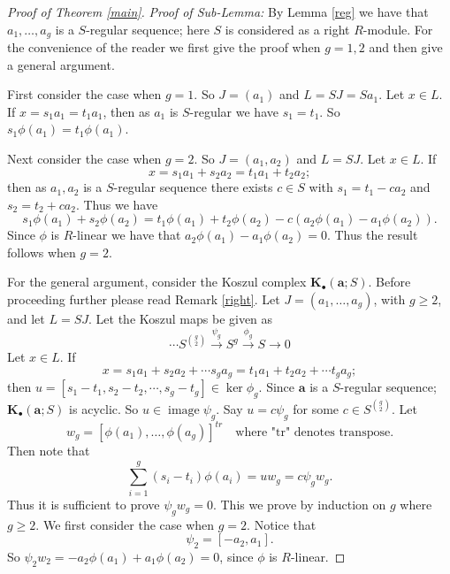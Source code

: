 \documentclass{amsart}
\theoremstyle{plain}
\theoremstyle{definition}
\theoremstyle{remark}
\numberwithin{equation}{theorem}
\begin{document}
\begin{proof}[Proof of Theorem \ref{main}]
\textit{Proof of Sub-Lemma:} By Lemma \ref{reg} we have that $a_1,\ldots,a_g$ is a $S$-regular sequence; here $S$ is considered as a right $R$-module.  For the convenience of the reader we first give the proof when $g = 1, 2$ and then give a
general argument.

First consider the case when $g = 1$. So $J = (a_1)$ and $L = SJ = Sa_1$. Let $x \in L$. If $x = s_1a_1 = t_1a_1$, then as $a_1$ is $S$-regular we have $s_1 = t_1$. So $s_1\phi(a_1) = t_1 \phi(a_1)$.

Next consider the case when $g = 2$. So $J = (a_1,a_2)$ and $L = SJ$.  Let $x \in L$. If
$$x = s_1a_1 + s_2 a_2 = t_1a_1 + t_2a_2; $$
then as $a_1, a_2$ is a $S$-regular sequence there exists $c \in S$ with  $s_1 = t_1 - ca_2$ and $s_2 = t_2 + ca_2$. Thus we have
\[
s_1\phi(a_1) + s_2 \phi(a_2) = t_1\phi(a_1) + t_2 \phi(a_2) - c\left(a_2\phi(a_1) - a_1\phi(a_2) \right).
\]
Since $\phi$ is $R$-linear we have that $a_2\phi(a_1) - a_1\phi(a_2) = 0$. Thus the result follows when $g = 2$.

For the general argument, consider the Koszul complex ${\mathbf{K}_{\bullet} }({\mathbf{a}};S)$. Before proceeding further please read Remark \ref{right}. Let $J = (a_1,\ldots,a_g)$, with $g \geq 2$, and let $L = SJ$.
Let the Koszul maps be given as
\[
\cdots S^{\binom{g}{2}} \xrightarrow{\psi_g} S^g \xrightarrow{\phi_g} S {\rightarrow} 0
\]
Let $x \in L$. If
\[
x = s_1a_1 + s_2 a_2 + \cdots s_g a_g = t_1a_1 + t_2a_2 + \cdots t_g a_g;
\]
then $u = [s_1 -t_1, s_2 -t_2,\cdots,s_g -t_g] \in \ker \phi_g$. Since ${\mathbf{a}}$ is a $S$-regular sequence;  ${\mathbf{K}_{\bullet} }({\mathbf{a}};S)$ is acyclic. So $u \in {\operatorname{image}} \psi_g$. Say $u = c\psi_g$ for some $c \in S^{\binom{g}{2}}$. Let
\[
w_g = [\phi(a_1),\ldots,\phi(a_g)]^{tr} \quad \text{where "tr" denotes transpose}.
\]
Then note that
\[
\sum_{i = 1}^{g}(s_i -t_i)\phi(a_i) = uw_g = c\psi_g w_g.
\]
Thus it is sufficient to prove $\psi_g w_g = 0$. This we prove by induction on $g$ where $g \geq 2$.
We first consider the case when $g = 2$. Notice that
\[
\psi_2 = [-a_2,a_1].
\]
So $\psi_2w_2 = -a_2\phi(a_1) + a_1 \phi(a_2) = 0$, since $\phi$ is $R$-linear.


\end{proof}
\end{document}
